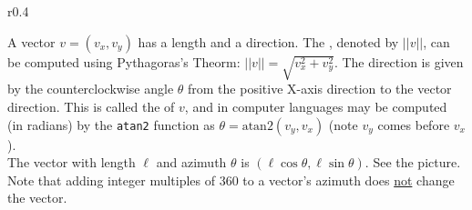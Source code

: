 \documentclass[12pt]{article}
\begin{document}
\begin{minipage}{\textwidth}\raggedright
\begin{wrapfigure}{r}{0.4\textwidth}
\end{wrapfigure}
A vector $v=(v_x,v_y)$ has a length and a direction.
The , denoted by $||v||$, can be computed using
Pythagoras's Theorm: $||v||=\sqrt{v_x^2+v_y^2}$.  The
direction is given by the counterclockwise angle $\theta$ from
the positive X-axis direction to the vector direction.
This is called the  of $v$, and in computer
languages may be computed (in radians) by the {\tt atan2} function as
$\theta = \mathrm{atan2}(v_y,v_x)$ (note $v_y$ comes before $v_x$).
\\[1ex]
The vector with length $\ell$ and azimuth $\theta$ is
$(\ell \cos\theta,\ell \sin\theta)$.
See the picture.
\\[1ex]
Note that adding integer multiples of 360 to a vector's
azimuth does \underline{not} change the vector.
\end{minipage}

\newpage
\end{document}
